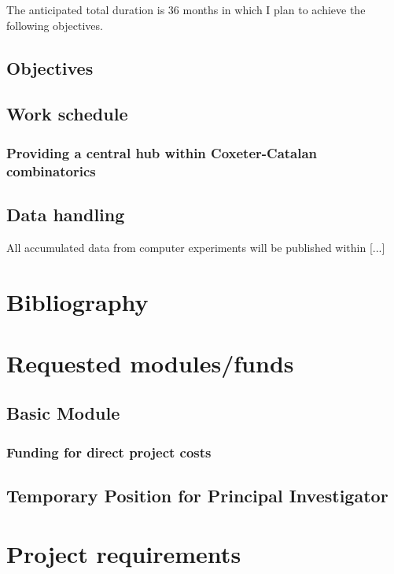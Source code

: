 \documentclass[a4paper,10pt,oneside]{article}
\begin{document}
The anticipated total duration is 36 months in which I plan to achieve the following objectives.

\subsection{Objectives}

\subsection{Work schedule}\label{sec:work schedule}

\subsubsection{Providing a central hub within Coxeter-Catalan combinatorics}
\label{sec:centralhub}


\subsection{Data handling}

All accumulated data from computer experiments will be published within [...]

\section{Bibliography}

\section{Requested modules/funds}

\subsection{Basic Module}

\subsubsection{Funding for direct project costs}\label{sec:sachmittel}

\subsection{Temporary Position for Principal Investigator}
\label{sec:position}

\section{Project requirements}
\end{document}
